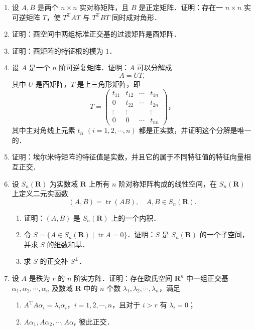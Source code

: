 \begin{enumerate}
  \item 设 $A,B$ 是两个 $n\times n$ 实对称矩阵，且 $B$ 是正定矩阵．证明：存在一 $n\times n$ 实可逆矩阵 $T$，使 $T^{\mathrm{T}}AT$ 与 $T^{\mathrm{T}}BT$ 同时成对角形．

  \ansproof
  \item 证明：酉空间中两组标准正交基的过渡矩阵是酉矩阵．

  \ansproof
  \item 证明：酉矩阵的特征根的模为 $1$．

  \ansproof
  \item 设 $A$ 是一个 $n$ 阶可逆复矩阵．证明：$A$ 可以分解成
  \[
  A=UT,
  \]
  其中 $U$ 是酉矩阵，$T$ 是上三角形矩阵，即
  \[
  T=\begin{pmatrix}
    t_{11} & t_{12} & \cdots & t_{1n} \\
    0 & t_{22} & \cdots & t_{2n} \\
    \vdots & \vdots & & \vdots \\
    0 & 0 & \cdots & t_{nn}
  \end{pmatrix}\text{，}
  \]
  其中主对角线上元素 $t_{ii}$ $(i=1,2,\cdots,n)$ 都是正实数，并证明这个分解是唯一的．

  \ansproof
  \item 证明：埃尔米特矩阵的特征值是实数，并且它的属于不同特征值的特征向量相互正交．

  \ansproof
  \item 设 $S_n(\mathbf{R})$ 为实数域 $\mathbf{R}$ 上所有 $n$ 阶对称矩阵构成的线性空间，在 $S_n(\mathbf{R})$ 上定义二元实函数
  \[
  (A,B)=\operatorname{tr}(AB),\quad A,B\in S_n(\mathbf{R}).
  \]
  \begin{enumerate}
    \item 证明：$(A,B)$ 是 $S_n(\mathbf{R})$ 上的一个内积．
  \anssub
    \item 令 $S=\{A\in S_n(\mathbf{R})\mid \operatorname{tr}A=0\}$．证明：$S$ 是 $S_n(\mathbf{R})$ 的一个子空间，并求 $S$ 的维数和基．
  \anssub
    \item 求 $S$ 的正交补 $S^{\perp}$．
  \anssub
  \end{enumerate}

  \item 设 $A$ 是秩为 $r$ 的 $n$ 阶实方阵．证明：存在欧氏空间 $\mathbf{R}^n$ 中一组正交基 $\alpha_1,\alpha_2,\cdots,\alpha_n$ 及数域 $\mathbf{R}$ 中的 $n$ 个数 $\lambda_1,\lambda_2,\cdots,\lambda_n$，满足
  \begin{enumerate}
    \item $A^{\mathrm{T}}A\alpha_i=\lambda_i\alpha_i$，$i=1,2,\cdots,n$，且对于 $i>r$ 有 $\lambda_i=0$；
  \anssub
    \item $A\alpha_1,A\alpha_2,\cdots,A\alpha_r$ 彼此正交．
  \anssub
  \end{enumerate}


\end{enumerate}
